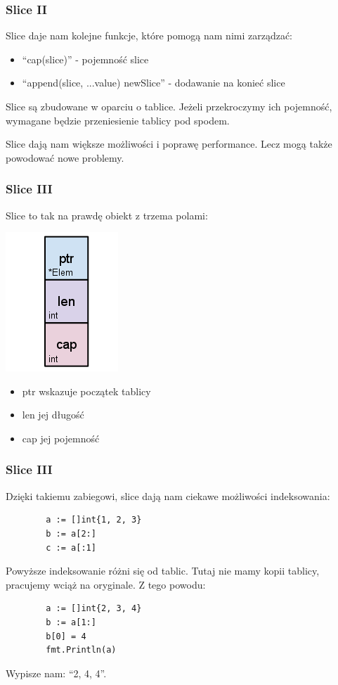 \documentclass[10pt]{beamer}
\newcommand{\quotes}[1]{``#1''}
\begin{document}
\begin{frame}[fragile]
    \frametitle{Slice II}
    Slice daje nam kolejne funkcje, które pomogą nam nimi zarządzać:
    \begin{itemize}
        \item \quotes{cap(slice)} - pojemność slice
        \item \quotes{append(slice, ...value) newSlice} - dodawanie na konieć slice
    \end{itemize}

    Slice są zbudowane w oparciu o tablice. Jeżeli przekroczymy ich pojemność, wymagane
    będzie przeniesienie tablicy pod spodem.

    Slice dają nam większe możliwości i poprawę performance. Lecz mogą także powodować
    nowe problemy.
\end{frame}

\begin{frame}[fragile]
    \frametitle{Slice III}
    Slice to tak na prawdę obiekt z trzema polami:

    \begin{center}
        \includegraphics[scale=1]{slice-struct.png}
    \end{center}

    \begin{itemize}
        \item ptr wskazuje początek tablicy
        \item len jej długość
        \item cap jej pojemność
    \end{itemize}
\end{frame}

\begin{frame}[fragile]
    \frametitle{Slice III}
    Dzięki takiemu zabiegowi, slice dają nam ciekawe możliwości indeksowania:

    \begin{verbatim}
        a := []int{1, 2, 3}
        b := a[2:]
        c := a[:1]
    \end{verbatim}

    Powyższe indeksowanie różni się od tablic. Tutaj nie mamy kopii tablicy, pracujemy
    wciąż na oryginale. Z tego powodu:

    \begin{verbatim}
        a := []int{2, 3, 4}
        b := a[1:]
        b[0] = 4
        fmt.Println(a)
    \end{verbatim}

    Wypisze nam: \quotes{2, 4, 4}.
\end{frame}
\end{document}
